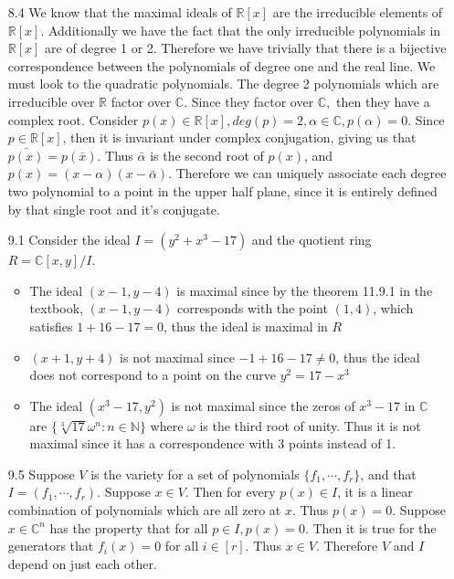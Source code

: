 \documentclass[12pt, letterpaper]{article}
\newcommand{\N}{\mathbb{N}}
\newcommand{\R}{\mathbb{R}}
\newcommand{\C}{\mathbb{C}}
\begin{document}
\begin{enumerate}
	
	\item[8.4] We know that the maximal ideals of $\R[x]$ are the irreducible 
	elements of $\R[x]$.  Additionally we have the fact that the only irreducible 
	polynomials in $\R[x]$ are of degree 1 or 2.  Therefore we have trivially 
	that there is a bijective correspondence between the polynomials of degree one
	and the real line.  We must look to the quadratic polynomials.   The degree 2
	polynomials which are irreducible over $\R$ factor over $\C$.  Since they 
	factor over $\C,$ then they have a complex root.  Consider $p(x) \in \R[x], 
	deg(p) = 2, \alpha \in \C, p(\alpha) = 0$.  Since $p \in \R[x]$, then it is 
	invariant under complex conjugation, giving us that $\bar{p(x)} = p(\bar{x})$.  Thus 
	$\bar{\alpha}$ is the second root of $p(x)$, and $p(x) = (x-\alpha)(x-\bar{\alpha})$.  Therefore we can uniquely associate each degree two polynomial to 
	a point in the upper half plane, since it is entirely defined by that single root and it's conjugate.  
	\item[9.1] Consider the ideal $I = (y^2 + x^3 - 17)$ and the quotient ring 
	$R = \C[x,y]/I$.  
	\begin{itemize}
		\item The ideal $(x-1,y-4)$ is maximal since by the theorem 11.9.1 in the textbook, $(x-1,y-4)$ corresponds with the point $(1,4)$, which satisfies $1 + 16 - 17 = 0$, thus the ideal is maximal in $R$
		\item $(x+1,y+4)$ is not maximal since $-1 + 16 - 17 \neq 0$,  thus 
		the ideal does not correspond to a point on the curve $y^2 = 17 - x^3$
		\item The ideal $(x^3 - 17,y^2)$ is not maximal since the zeros of $x^3 - 17$ in $\C$ are $\{\sqrt[3]{17}\omega^n: n \in \N \}$ where $\omega$ is the third 
		root of unity.  Thus it is not maximal since it has a correspondence with 
		3 points instead of 1.  
	\end{itemize}
	\item[9.5] Suppose $V$ is the variety for a set of polynomials $\{f_1,\cdots,f_r\}$, and that $I = (f_1,\cdots,f_r)$.  Suppose $x \in V$.  Then 
	for every $p(x) \in I$, it is a linear combination of polynomials which are all 
	zero at $x$.  Thus $p(x) = 0$.  Suppose $x \in \C^n$ has the property that
	for all $p \in I, p(x) = 0$.  Then it is true for the generators that $f_i(x) = 0$ for all $i \in [r]$.  Thus $x \in V$.  Therefore $V$ and $I$ depend on just each 
	other.   
\end{enumerate}
\end{document}
